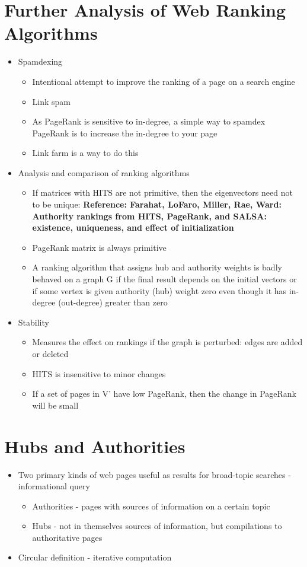 \documentclass[11pt]{report}
\begin{document}
\section{Further Analysis of Web Ranking Algorithms}
\begin{itemize}
\item Spamdexing
\begin{itemize}
\item Intentional attempt to improve the ranking of a page on a search engine 
\item Link spam
\item As PageRank is sensitive to in-degree, a simple way to spamdex PageRank is to increase the in-degree to your page
\item Link farm is a way to do this
\end{itemize}
\item Analysis and comparison of ranking algorithms
\begin{itemize}
\item If matrices with HITS are not primitive, then the eigenvectors need not to be unique: \textbf{Reference: Farahat, LoFaro, Miller, Rae, Ward: Authority rankings from HITS, PageRank, and SALSA: existence, uniqueness, and effect of initialization}
\item PageRank matrix is always primitive
\item A ranking algorithm that assigns hub and authority weights is badly behaved on a graph G if the final result depends on the initial vectors or if some vertex is given authority (hub) weight zero even though it has in-degree (out-degree) greater than zero
\end{itemize}
\item Stability
\begin{itemize}
\item Measures the effect on rankings if the graph is perturbed: edges are added or deleted
\item HITS is insensitive to minor changes
\item If a set of pages in V' have low PageRank, then the change in PageRank will be small
\end{itemize}
\end{itemize}
\section{Hubs and Authorities}
\begin{itemize}
\item Two primary kinds of web pages useful as results for broad-topic searches - informational query
\begin{itemize}
\item Authorities - pages with sources of information on a certain topic
\item Hubs - not in themselves sources of information, but compilations to authoritative pages
\end{itemize}
\item Circular definition - iterative computation
\end{itemize}
\end{document}
